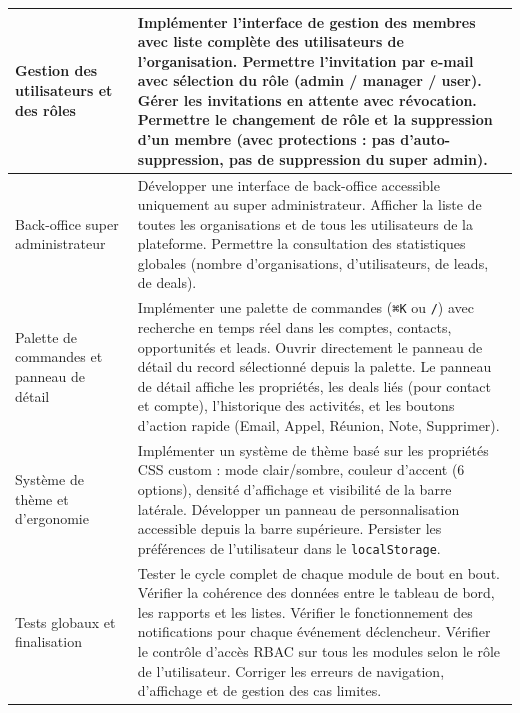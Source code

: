\documentclass[12pt,a4paper,twoside,openany]{book}
\begin{document}
\begin{table}[h]
{\begin{tabular}{|p{4cm}|p{10.5cm}|}
Gestion des utilisateurs et des rôles
&
Implémenter l’interface de gestion des membres avec liste complète des utilisateurs de l’organisation. \newline
Permettre l’invitation par e-mail avec sélection du rôle (admin / manager / user). \newline
Gérer les invitations en attente avec révocation. \newline
Permettre le changement de rôle et la suppression d’un membre (avec protections : pas d’auto-suppression, pas de suppression du super admin). \\
\hline

Back-office super administrateur
&
Développer une interface de back-office accessible uniquement au super administrateur. \newline
Afficher la liste de toutes les organisations et de tous les utilisateurs de la plateforme. \newline
Permettre la consultation des statistiques globales (nombre d’organisations, d’utilisateurs, de leads, de deals). \\
\hline

Palette de commandes et panneau de détail
&
Implémenter une palette de commandes (\texttt{⌘K} ou \texttt{/}) avec recherche en temps réel dans les comptes, contacts, opportunités et leads. \newline
Ouvrir directement le panneau de détail du record sélectionné depuis la palette. \newline
Le panneau de détail affiche les propriétés, les deals liés (pour contact et compte), l’historique des activités, et les boutons d’action rapide (Email, Appel, Réunion, Note, Supprimer). \\
\hline

Système de thème et d’ergonomie
&
Implémenter un système de thème basé sur les propriétés CSS custom : mode clair/sombre, couleur d’accent (6 options), densité d’affichage et visibilité de la barre latérale. \newline
Développer un panneau de personnalisation accessible depuis la barre supérieure. \newline
Persister les préférences de l’utilisateur dans le \texttt{localStorage}. \\
\hline

Tests globaux et finalisation
&
Tester le cycle complet de chaque module de bout en bout. \newline
Vérifier la cohérence des données entre le tableau de bord, les rapports et les listes. \newline
Vérifier le fonctionnement des notifications pour chaque événement déclencheur. \newline
Vérifier le contrôle d’accès RBAC sur tous les modules selon le rôle de l’utilisateur. \newline
Corriger les erreurs de navigation, d’affichage et de gestion des cas limites. \\
\hline

\end{tabular}
}
\end{table}
\end{document}
